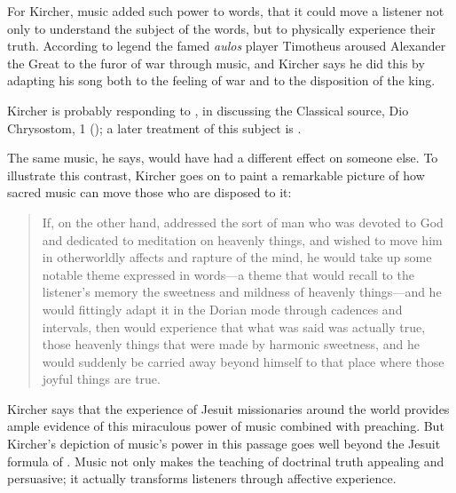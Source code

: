 For Kircher, music added such power to words, that it could move a listener not
only to understand the subject of the words, but to physically experience their
truth.
According to legend the famed \emph{aulos} player Timotheus aroused Alexander
the Great to the furor of war through music, and Kircher says he did this by
adapting his song both to the feeling of war and to the disposition of the
king.%
\begin{Footnote}
    Kircher is probably responding to \autocite[90]{Galilei:Dialogo}, in
    discussing the Classical source, Dio Chrysostom,  1
    (); a later treatment of this subject is
    \autocite{Dryden:Alexander}.
\end{Footnote}
The same music, he says, would have had a different effect on someone else.
To illustrate this contrast, Kircher goes on to paint a remarkable picture of
how sacred music can move those who are disposed to it:
\begin{quote}
    If, on the other hand,  addressed the sort of man who
    was devoted to God and dedicated to meditation on heavenly things, and
    wished to move him in otherworldly affects and rapture of the mind, he would
    take up some notable theme expressed in words---a theme that would recall to
    the listener's memory the sweetness and mildness of heavenly things---and he
    would fittingly adapt it in the Dorian mode through cadences and intervals,
    then  would experience that what was said was actually
    true, those heavenly things that were made by harmonic sweetness, and he
    would suddenly be carried away beyond himself to that place where those
    joyful things are true.%
        \Autocite[, : .] 
        {Kircher:Musurgia}
\end{quote}
Kircher says that the experience of Jesuit missionaries around the world
provides ample evidence of this miraculous power of music combined with
preaching.
But Kircher's depiction of music's power in this passage goes well beyond the
Jesuit formula of .%
    \Autocite
    [On the Jesuit approach to religious arts, see] [35--51]
    {Bailey:Art}
Music not only makes the teaching of doctrinal truth appealing and persuasive;
it actually transforms listeners through affective experience.

